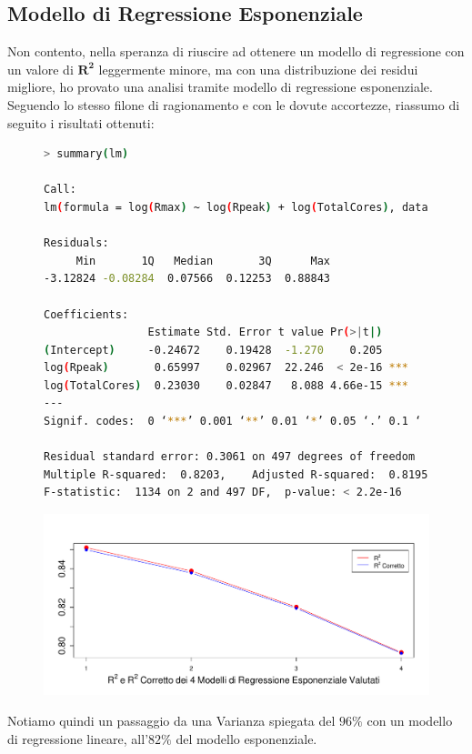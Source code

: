 \documentclass[11pt,a4paper]{article}
\begin{document}
\subsection{Modello di Regressione Esponenziale}
Non contento, nella speranza di riuscire ad ottenere un modello di regressione
con un valore di $\boldsymbol{R^2}$ leggermente minore, ma con una distribuzione
dei residui migliore, ho provato una analisi tramite modello di regressione
esponenziale. Seguendo lo stesso filone di ragionamento e con le dovute
accortezze, riassumo di seguito i risultati ottenuti:
\clearpage
\begin{figure}[h]
	\vspace{-1cm}
	\hspace{-2.15cm}
	\begin{minipage}{.6\textwidth} 
		\begin{lstlisting}[language=bash,basicstyle=\tiny,tabsize=2,frame = single]
> summary(lm)

Call:
lm(formula = log(Rmax) ~ log(Rpeak) + log(TotalCores), data = data)

Residuals:
     Min       1Q   Median       3Q      Max 
-3.12824 -0.08284  0.07566  0.12253  0.88843 

Coefficients:
                Estimate Std. Error t value Pr(>|t|)    
(Intercept)     -0.24672    0.19428  -1.270    0.205    
log(Rpeak)       0.65997    0.02967  22.246  < 2e-16 ***
log(TotalCores)  0.23030    0.02847   8.088 4.66e-15 ***
---
Signif. codes:  0 ‘***’ 0.001 ‘**’ 0.01 ‘*’ 0.05 ‘.’ 0.1 ‘ ’ 1

Residual standard error: 0.3061 on 497 degrees of freedom
Multiple R-squared:  0.8203,	Adjusted R-squared:  0.8195 
F-statistic:  1134 on 2 and 497 DF,  p-value: < 2.2e-16
		\end{lstlisting}
	\end{minipage}
	\begin{minipage}{0.5\textwidth} 
		\includegraphics[scale=.4]{imgs/r_squared_exp.pdf}
	\end{minipage}
\end{figure}
\vspace{-0.4cm}\noindent
Notiamo quindi un passaggio da una Varianza spiegata del $96\%$ con un modello
di regressione lineare, all'$82\%$ del modello esponenziale.
\end{document}

